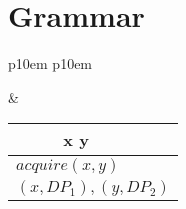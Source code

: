 \section{Grammar}
\label{sec:grammar}
\lipsum[1]

\medskip
\begin{center}
\begin{tabular}{ p{10em} p{10em} }
	\label{tbl:grammar.acquire}
	
	\begin{center}
		\begin{tikzpicture}
		\Tree [.S [.DP$_1\downarrow$ ] [.VP [.V acquire ] DP$_2^\ast$ ] ]
		\end{tikzpicture}
	\end{center}
	
	&
	
	\begin{center}
		\begin{tabular}{|c|l|}
			\hline
			& x y \\ 
			\hline
			\multicolumn{2}{|l|}{
				$acquire(x,y)$
			} \\
			\hline
			\multicolumn{2}{|l|}{
				$(x,DP_{1}),(y,DP_{2})$
			} \\
			\hline
		\end{tabular}
	\end{center}	
	\\
\end{tabular}
\end{center}
\medskip

\lipsum[1]